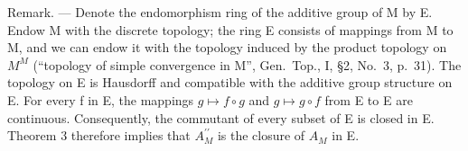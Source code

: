 Remark. --- Denote the endomorphism ring of the additive group of M by E. Endow M with the discrete topology; the ring E consists of mappings from M to M, and we can endow it with the topology induced by the product topology on \(M^{M}\) (``topology of simple convergence in M'', Gen.~Top., I, §2, No.~3, p.~31). The topology on E is Hausdorff and compatible with the additive group structure on E. For every f in E, the mappings \(g \mapsto f \circ g\) and \(g \mapsto g \circ f\) from E to E are continuous. Consequently, the commutant of every subset of E is closed in E. Theorem 3 therefore implies that \(A_{M}^{\prime\prime}\) is the closure of \(A_{M}\) in E.

